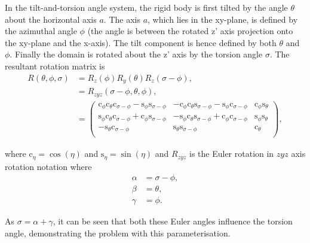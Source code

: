 In the tilt-and-torsion angle system, the rigid body is first tilted by the angle $\theta$ about the horizontal axis $a$.
The axis $a$, which lies in the xy-plane, is defined by the azimuthal angle $\phi$ (the angle is between the rotated z' axis projection onto the xy-plane and the x-axis).
The tilt component is hence defined by both $\theta$ and $\phi$.
Finally the domain is rotated about the z' axis by the torsion angle $\sigma$.
The resultant rotation matrix is
\begin{subequations}
\begin{align}
    R(\theta, \phi, \sigma)
        &= R_z(\phi)R_y(\theta)R_z(\sigma-\phi) , \\
        &= R_{zyz}(\sigma-\phi, \theta, \phi) , \\
        &= \begin{pmatrix}
            \mathrm{c}_\phi \mathrm{c}_\theta \mathrm{c}_{\sigma-\phi} - \mathrm{s}_\phi \mathrm{s}_{\sigma-\phi} & -\mathrm{c}_\phi \mathrm{c}_\theta \mathrm{s}_{\sigma-\phi} - \mathrm{s}_\phi \mathrm{c}_{\sigma-\phi} & \mathrm{c}_\phi \mathrm{s}_\theta \\
            \mathrm{s}_\phi \mathrm{c}_\theta \mathrm{c}_{\sigma-\phi} + \mathrm{c}_\phi \mathrm{s}_{\sigma-\phi} & -\mathrm{s}_\phi \mathrm{c}_\theta \mathrm{s}_{\sigma-\phi} + \mathrm{c}_\phi \mathrm{c}_{\sigma-\phi} & \mathrm{s}_\phi \mathrm{s}_\theta \\
            -\mathrm{s}_\theta \mathrm{c}_{\sigma-\phi}                                                           &  \mathrm{s}_\theta \mathrm{s}_{\sigma-\phi}                                                            & \mathrm{c}_\theta \\
        \end{pmatrix} , \label{eq: R torsion-tilt}
\end{align}
\end{subequations}

where $\mathrm{c}_\eta = \cos(\eta)$ and $\mathrm{s}_\eta = \sin(\eta)$ and $R_{zyz}$ is the Euler rotation in $zyz$ axis rotation notation where
\begin{subequations}
\begin{align}
    \alpha &= \sigma - \phi , \\
    \beta  &= \theta , \\
    \gamma &= \phi .
\end{align}
\end{subequations}

As $\sigma = \alpha + \gamma$, it can be seen that both these Euler angles influence the torsion angle, demonstrating the problem with this parameterisation.

